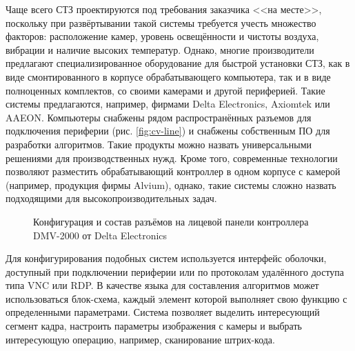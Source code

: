 Чаще всего СТЗ проектируются под требования заказчика <<на месте>>, поскольку при развёртывании такой системы требуется учесть множество факторов: расположение камер, уровень освещённости и чистоты воздуха, вибрации и наличие высоких температур. Однако, многие производители предлагают специализированное оборудование для быстрой установки СТЗ, как в виде смонтированного в корпусе обрабатывающего компьютера, так и в виде полноценных комплектов, со своими камерами и другой периферией. Такие системы предлагаются, например, фирмами Delta Electronics, Axiomtek или AAEON. Компьютеры снабжены рядом распространённых разъемов для подключения периферии (рис. \cref{fig:cv-line}) и снабжены собственным ПО для разработки алгоритмов. Такие продукты можно назвать универсальными решениями для производственных нужд. Кроме того, современные технологии позволяют разместить обрабатывающий контроллер в одном корпусе с камерой (например, продукция фирмы Alvium), однако, такие системы сложно назвать подходящими для высокопроизводительных задач.

\begin{figure}[h]
	\caption{Конфигурация и состав разъёмов на лицевой панели контроллера DMV-2000 от Delta Electronics}\label{fig:delta-el}
\end{figure}

Для конфигурирования подобных систем используется интерфейс оболочки, доступный при подключении периферии или по протоколам удалённого доступа типа VNC или RDP. В качестве языка для составления алгоритмов может использоваться блок-схема, каждый элемент которой выполняет свою функцию с определенными параметрами. Система позволяет выделить интересующий сегмент кадра, настроить параметры изображения с камеры и выбрать интересующую операцию, например, сканирование штрих-кода.

